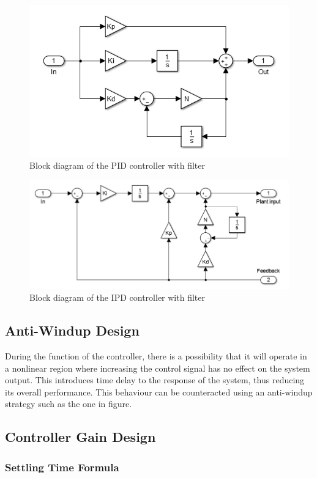 \begin{figure}[!h]
	\centering
	\includegraphics[width=.7\linewidth]{graphics/pidwfilter}
	\caption{Block diagram of the PID controller with filter}
	\label{fig:pidfilter}
\end{figure}

\begin{figure}[!h]
	\centering
	\includegraphics[width=.9\linewidth]{graphics/ipdwfilter}
	\caption{Block diagram of the IPD controller with filter}
	\label{fig:ipdfilter}
\end{figure}


\subsection{Anti-Windup Design}

During the function of the controller, there is a possibility that it will operate in a nonlinear region where increasing the control signal has no effect on the system output. This introduces time delay to the response of the system, thus reducing its overall performance. This behaviour can be counteracted using an anti-windup strategy such as the one in figure.

\subsection{Controller Gain Design}

\subsubsection{Settling Time Formula}



